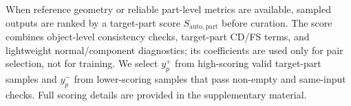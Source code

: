 \documentclass[10pt,twocolumn,letterpaper]{article}
\begin{document}
When reference geometry or reliable part-level metrics are available, sampled outputs are ranked by a target-part score $S_{\mathrm{auto},\mathrm{part}}$ before curation. The score combines object-level consistency checks, target-part CD/FS terms, and lightweight normal/component diagnostics; its coefficients are used only for pair selection, not for training. We select $y_p^+$ from high-scoring valid target-part samples and $y_p^-$ from lower-scoring samples that pass non-empty and same-input checks. Full scoring details are provided in the supplementary material.
\end{document}

